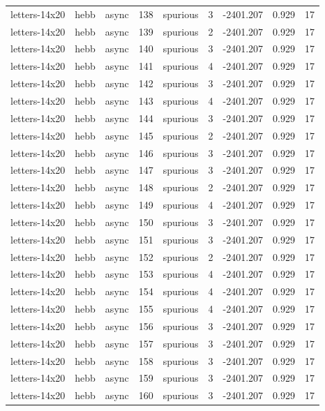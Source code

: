 \begin{tabular}{lllrlrrrr}
letters-14x20 & hebb & async & 138 & spurious & 3 & -2401.207 & 0.929 & 17 \\
letters-14x20 & hebb & async & 139 & spurious & 2 & -2401.207 & 0.929 & 17 \\
letters-14x20 & hebb & async & 140 & spurious & 3 & -2401.207 & 0.929 & 17 \\
letters-14x20 & hebb & async & 141 & spurious & 4 & -2401.207 & 0.929 & 17 \\
letters-14x20 & hebb & async & 142 & spurious & 3 & -2401.207 & 0.929 & 17 \\
letters-14x20 & hebb & async & 143 & spurious & 4 & -2401.207 & 0.929 & 17 \\
letters-14x20 & hebb & async & 144 & spurious & 3 & -2401.207 & 0.929 & 17 \\
letters-14x20 & hebb & async & 145 & spurious & 2 & -2401.207 & 0.929 & 17 \\
letters-14x20 & hebb & async & 146 & spurious & 3 & -2401.207 & 0.929 & 17 \\
letters-14x20 & hebb & async & 147 & spurious & 3 & -2401.207 & 0.929 & 17 \\
letters-14x20 & hebb & async & 148 & spurious & 2 & -2401.207 & 0.929 & 17 \\
letters-14x20 & hebb & async & 149 & spurious & 4 & -2401.207 & 0.929 & 17 \\
letters-14x20 & hebb & async & 150 & spurious & 3 & -2401.207 & 0.929 & 17 \\
letters-14x20 & hebb & async & 151 & spurious & 3 & -2401.207 & 0.929 & 17 \\
letters-14x20 & hebb & async & 152 & spurious & 2 & -2401.207 & 0.929 & 17 \\
letters-14x20 & hebb & async & 153 & spurious & 4 & -2401.207 & 0.929 & 17 \\
letters-14x20 & hebb & async & 154 & spurious & 4 & -2401.207 & 0.929 & 17 \\
letters-14x20 & hebb & async & 155 & spurious & 4 & -2401.207 & 0.929 & 17 \\
letters-14x20 & hebb & async & 156 & spurious & 3 & -2401.207 & 0.929 & 17 \\
letters-14x20 & hebb & async & 157 & spurious & 3 & -2401.207 & 0.929 & 17 \\
letters-14x20 & hebb & async & 158 & spurious & 3 & -2401.207 & 0.929 & 17 \\
letters-14x20 & hebb & async & 159 & spurious & 3 & -2401.207 & 0.929 & 17 \\
letters-14x20 & hebb & async & 160 & spurious & 3 & -2401.207 & 0.929 & 17 \\

\end{tabular}
